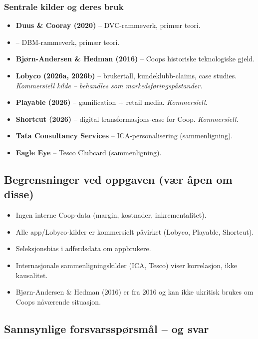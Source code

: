\subsubsection*{Sentrale kilder og deres bruk}
\begin{itemize}
  \item \textbf{Duus \& Cooray (2020)} -- DVC-rammeverk, primær teori.
  \item \textbf{} -- DBM-rammeverk, primær teori.
  \item \textbf{Bjørn-Andersen \& Hedman (2016)} -- Coops historiske
    teknologiske gjeld.
  \item \textbf{Lobyco (2026a, 2026b)} -- brukertall, kundeklubb-claims,
    case studies. \emph{Kommersiell kilde -- behandles som
    markedsføringspåstander.}
  \item \textbf{Playable (2026)} -- gamification + retail media.
    \emph{Kommersiell.}
  \item \textbf{Shortcut (2026)} -- digital transformasjons-case for Coop.
    \emph{Kommersiell.}
  \item \textbf{Tata Consultancy Services} -- ICA-personalisering
    (sammenligning).
  \item \textbf{Eagle Eye} -- Tesco Clubcard (sammenligning).
\end{itemize}

\subsection{Begrensninger ved oppgaven (vær åpen om disse)}
\begin{itemize}
  \item Ingen interne Coop-data (margin, kostnader, inkrementalitet).
  \item Alle app/Lobyco-kilder er kommersielt påvirket (Lobyco, Playable,
    Shortcut).
  \item Seleksjonsbias i adferdsdata om appbrukere.
  \item Internasjonale sammenligningskilder (ICA, Tesco) viser korrelasjon,
    ikke kausalitet.
  \item Bjørn-Andersen \& Hedman (2016) er fra 2016 og kan ikke ukritisk
    brukes om Coops nåværende situasjon.
\end{itemize}

\subsection{Sannsynlige forsvarsspørsmål -- og svar}

